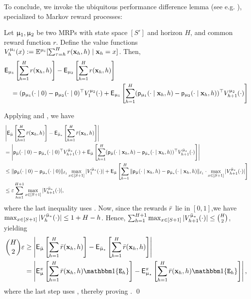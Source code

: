 	To conclude, we invoke the ubiquitous performance difference lemma (see e.g. \citep[Lemma 5.3.1]{kakade2003sample}), specialized to Markov reward processes:
	\begin{lemma}\label{lem:perf_diff} Let $\upmu_1,\upmu_2$ be two MRPs with state space $[S']$ and horizon $H$, and common reward function $r$. Define the value functions $V^{\upmu_i}_h(x) := \mathbb{E}^{\upmu_i}[\sum_{\tau=h}^{H} r(\mathbf{x}_h,h)  \mid \mathbf{x}_h = x]$. Then,
	\begin{align*}
	&\mathsf{E}_{\upmu_1}\left[\sum_{h=1}^H r(\mathbf{x}_h,h)\right] - \mathsf{E}_{\upmu_2}\left[\sum_{h=1}^H r(\mathbf{x}_h,h)\right] \\
	&\quad=  (\mathsf{p}_{\upmu_1}(\cdot \mid 0) - \mathsf{p}_{\upmu_2}(\cdot \mid 0)^\top V^{\upmu_2}_{1}(\cdot)  +  \mathsf{E}_{\upmu_1}\left[\sum_{h=1}^H (\mathsf{p}_{\upmu_1}(\cdot \mid \mathbf{x}_h,h) - \mathsf{p}_{\upmu_2}(\cdot \mid \mathbf{x}_h,h))^\top V^{\upmu_2}_{h+1}(\cdot)\right]
	\end{align*}
	\end{lemma}
	Applying  and ,  we have
	\begin{align*}
	&\left|\mathsf{E}_{\bar{\upmu}}\left[\sum_{h=1}^H \bar{r}(\mathbf{x}_h,h)\right] - \mathsf{E}_{\bar{\upmu}_{\star}}\left[\sum_{h=1}^H \bar{r}(\mathbf{x}_h,h)\right]\right|\\
	&= \left|\mathsf{p}_{\bar{\upmu}}(\cdot \mid 0) - \mathsf{p}_{\bar{\upmu}_{\star}}(\cdot \mid 0 )^\top V^{\bar{\upmu}_{\star}}_{h+1}(\cdot) + \mathsf{E}_{\bar{\upmu}}\left[\sum_{h=1}^H (\mathsf{p}_{\bar{\upmu}}(\cdot \mid \mathbf{x}_h,h) - \mathsf{p}_{\bar{\upmu}_{\star}}(\cdot \mid \mathbf{x}_h,h))^\top V^{\bar{\upmu}_{\star}}_{h+1}(\cdot)\right]\right|\\
	&\le \|\mathsf{p}_{\bar{\upmu}}(\cdot \mid 0) - \mathsf{p}_{\bar{\upmu}_{\star}}(\cdot \mid 0 )\|_{\ell_1} \max_{x \in [S+1]} |V^{\bar{\upmu}_{\star}}_{1}(\cdot)| +
	\mathsf{E}_{\bar{\upmu}}\left[\sum_{h=1}^H \|\mathsf{p}_{\bar{\upmu}}(\cdot \mid \mathbf{x}_h,h) - \mathsf{p}_{\bar{\upmu}_{\star}}(\cdot \mid \mathbf{x}_h,h)\|_{\ell_1} \cdot \max_{x \in [S+1]} |V^{\bar{\upmu}_{\star}}_{h+1}(\cdot)|\right]\\
	&\le \varepsilon \sum_{h=1}^{H+1} \max_{x \in [S+1]} |V^{\bar{\upmu}_{\star}}_{h+1}(\cdot)|,
	\end{align*}
	where the last inequality uses . Now, since the rewards $\bar{r}$ lie in $[0,1]$,we have $\max_{x \in [S+1]} |V^{\bar{\upmu}_{\star}}_{h}(\cdot)| \le 1 + H - h$. Hence, $\sum_{h=1}^{H+1} \max_{x \in [S+1]} |V^{\bar{\upmu}_{\star}}_{h+1}(\cdot)| \le \binom{H}{2}$, yielding
	\begin{align*}
	\binom{H}{2}\varepsilon &\ge  \left|\sfE_{\barmod}\left[\sum_{h=1}^H \rbar(\bmx_h,h)\right] - \sfE_{\barmodst}\left[\sum_{h=1}^H \rbar(\bmx_h,h)\right]\right| \\
	&= \left|\sfE^{\pi}_{\model}\left[\sum_{h=1}^H \rbar(\bmx_h,h) \ind\{\scrE_h\}\right] - \sfE^{\pi}_{\modst}\left[\sum_{h=1}^H \rbar(\bmx_h,h) \ind\{\scrE_h\}\right]\right|,
	\end{align*}
	where the last step uses , thereby proving .
	\qed


